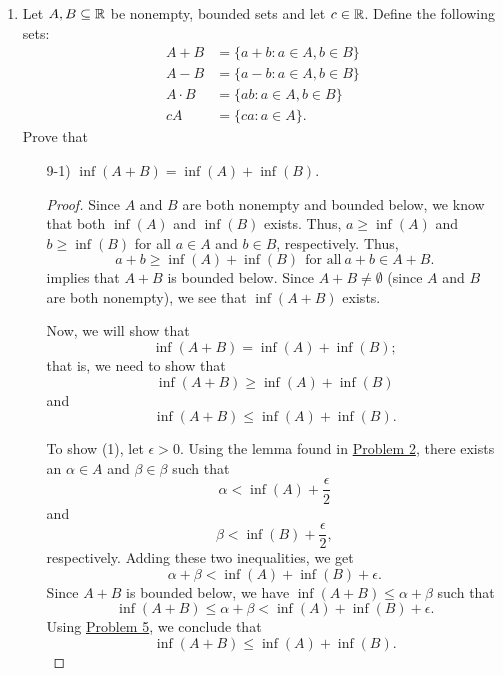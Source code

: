 \documentclass[11pt,a4paper]{article}
\begin{document}
\begin{enumerate}
\begin{proof}
    \end{proof}




\item Let \( A, B \subseteq \mathbb{R}  \) be nonempty, bounded sets and let \( c \in \mathbb{R}  \). Define the following sets:
    \begin{align*}
        A + B &= \{ a + b : a \in A, b \in B \}  \\
        A - B &= \{ a - b : a \in A , b \in B  \}  \\
        A \cdot B &= \{ ab : a \in A, b \in B \} \\
        cA &= \{ ca: a \in A \}.
    \end{align*}
    Prove that 
    \begin{enumerate}
        \item[9-1)] \( \inf(A + B) = \inf(A) + \inf(B) \).
            \begin{proof}
                Since \( A  \) and \( B  \) are both nonempty and bounded below, we know that both \( \inf(A) \) and \( \inf(B) \) exists. Thus, \( a \geq \inf(A) \) and \( b \geq \inf(B) \) for all \( a \in A  \) and \( b \in B  \), respectively. Thus, 
                \[  a + b \geq \inf(A) + \inf(B) \ \ \text{for all} \ a + b \in A + B. \]
                implies that \( A + B  \) is bounded below. Since \( A + B \neq \emptyset  \) (since \( A  \) and \( B  \) are both nonempty), we see that \( \inf(A+B)  \) exists.

                Now, we will show that 
                \[  \inf(A+B) = \inf(A) + \inf(B);  \]
                that is, we need to show that 
                \[  \inf(A+B) \geq \inf(A) + \inf(B) \tag{1}  \]
                and 
                \[  \inf(A+B) \leq \inf(A) + \inf(B). \tag{2} \]

                To show (1), let \( \epsilon > 0 \). Using the lemma found in {\hyperref[Problem 2]{Problem 2}}, there exists an \( \alpha \in A  \) and \( \beta \in \beta  \) such that 
                \[  \alpha < \inf(A) + \frac{ \epsilon }{ 2 } \]
                and
                \[  \beta < \inf(B) + \frac{ \epsilon }{ 2 },  \]
                respectively. Adding these two inequalities, we get
                \[  \alpha + \beta < \inf(A) + \inf(B) + \epsilon. \]
                Since \( A + B  \) is bounded below, we have \( \inf(A+B) \leq \alpha + \beta  \) such that 
                \[  \inf(A+B) \leq \alpha + \beta < \inf(A) + \inf(B) + \epsilon. \]
                Using {\hyperref[Problem 5]{Problem 5}}, we conclude that   
                \[  \inf(A+B) \leq \inf(A) + \inf(B). \]


\end{proof}
\end{enumerate}
\end{enumerate}
\end{document}

